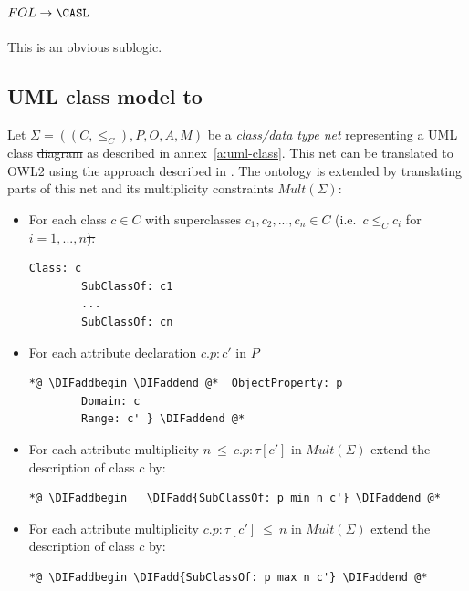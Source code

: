 \documentclass[10pt,fleqn,final]{scrreprt}
\newcommand{\ssclause}[1]{\subsection{#1}}
\providecommand{\DIFadd}[1]{{\protect\color{blue}\uwave{#1}}} %
\providecommand{\DIFdel}[1]{{\protect\color{red}\sout{#1}}}                      %
\providecommand{\DIFaddbegin}{} %
\providecommand{\DIFaddend}{} %
\providecommand{\DIFdelbegin}{} %
\providecommand{\DIFdelend}{} %
\begin{document}
\ssclause{$FOL \to \CASL$}
This is an obvious sublogic.

 

\DIFdelbegin %
\DIFdelend \DIFaddbegin \ssclause{UML class model to \OWL}
\DIFaddend Let $\Sigma = ((C, {\leq_C}), P, O, A, M)$ be a \emph{class/data type net} representing a UML 
class \DIFdelbegin \DIFdel{diagram }\DIFdelend \DIFaddbegin \DIFadd{model }\DIFaddend as described in annex~\ref{a:uml-class}. This net can be translated to OWL2 using the approach described in \cite{zedlitz2012uml}.
The ontology is extended by translating parts of this net and its multiplicity constraints $\mathit{Mult}(\Sigma)$:
\begin{itemize}
\item For each class $c \in C$ with superclasses \DIFdelbegin \DIFdel{$c_1,c_2,...,c_n \in C$ }\DIFdelend \DIFaddbegin \DIFadd{$c_1,c_2,\ldots,c_n \in C$ }\DIFaddend (i.e.\ $c \leq_C c_i$ for \DIFdelbegin \DIFdel{$i=1,...,n$):} \DIFdelend
\DIFaddbegin \DIFadd{$i=1,\ldots,n$):} \DIFaddend
{}
\begin{lstlisting}[language=owl2Manchester]
		    Class: c
		SubClassOf: c1
		...
		SubClassOf: cn
\end{lstlisting}
\item For each attribute declaration $c.p:c'$ in $P$
\begin{lstlisting}[language=owl2Manchester]
	*@ \DIFaddbegin \DIFaddend @*  ObjectProperty: p
		Domain: c
		Range: c' } \DIFaddend @*
\end{lstlisting}

\item For each attribute multiplicity $n\ \mathsf{\leq}\ c.p:\tau[c']$ in $\mathit{Mult}(\Sigma)$ extend the description of class $c$ by:
\begin{lstlisting}[language=owl2Manchester]
	*@ \DIFaddbegin   \DIFadd{SubClassOf: p min n c'} \DIFaddend @*
\end{lstlisting}

\item For each attribute multiplicity $ c.p:\tau[c'] \ \mathsf{\leq}\ n$  in $\mathit{Mult}(\Sigma)$ extend the description of class $c$ by:
 \begin{lstlisting}[language=owl2Manchester]
	*@ \DIFaddbegin \DIFadd{SubClassOf: p max n c'} \DIFaddend @*
\end{lstlisting}


\end{itemize}
\end{document}
